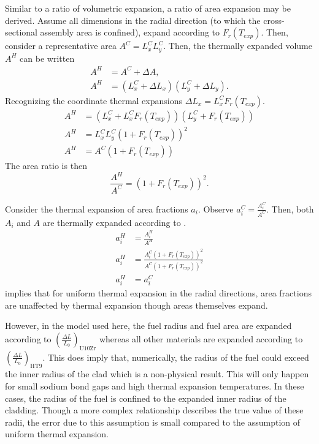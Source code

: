   Similar to a ratio of volumetric expansion, a ratio of area expansion may be
  derived. Assume all dimensions in the radial direction (to which the
  cross-sectional assembly area is confined), expand according to
  $F_r(T_{exp})$. Then, consider a representative area $A^C = L_x^C L_y^C$.
  Then, the thermally expanded volume $A^H$ can be written
  \begin{align}
    A^H &= A^C + \Delta A, \\
    A^H &= (L_x^C + \Delta L_x) (L_y^C + \Delta L_y).
  \end{align}
  Recognizing the coordinate thermal expansions ${\Delta L_x = L_x^C
  F_r(T_{exp})}$.
  \begin{align}
    A^H &= (L_x^C + L_x^C F_r(T_{exp})) (L_y^C + F_r(T_{exp})) \\
    A^H &= L_x^C L_y^C (1 + F_r(T_{exp}))^2 \\
    A^H &= A^C (1 + F_r(T_{exp}))
  \end{align}
  The area ratio is then
  \begin{equation}
    \label{eq:area_ratio}
    \frac{A^H}{A^C} = (1 + F_r(T_{exp}))^2.
  \end{equation}

  Consider the thermal expansion of area fractions $a_i$. Observe $a_i^C =
  \frac{A_i^C}{A^C}$. Then, both $A_i$ and $A$ are thermally expanded according
  to .
  \begin{align}
    a_i^H &= \frac{A_i^H}{A^H} \\
    a_i^H &= \frac{A_i^C (1 + F_r(T_{exp}))^2}{A^C (1 + F_r(T_{exp}))^2} \\
    \label{eq:constant_area_frac}
    a_i^H &= a_i^C
  \end{align}
   implies that for uniform thermal expansion in the
  radial directions, area fractions are unaffected by thermal expansion though
  areas themselves expand. 
  
  However, in the model used here, the fuel radius and fuel area
  are expanded according to $\left(\frac{\Delta L}{L_0}\right)_{\text{U10Zr}}$
  whereas all other materials are expanded according to 
  $\left(\frac{\Delta L}{L_0}\right)_{\text{HT9}}$. This does imply that,
  numerically, the radius of the fuel could exceed the inner radius of the clad
  which is a non-physical result. This will only happen for small sodium bond
  gaps and high thermal expansion temperatures. In these cases, the radius of
  the fuel is confined to the expanded inner radius of the cladding. Though a
  more complex relationship describes the true value of these radii, the error
  due to this assumption is small compared to the assumption of uniform thermal
  expansion.
  
